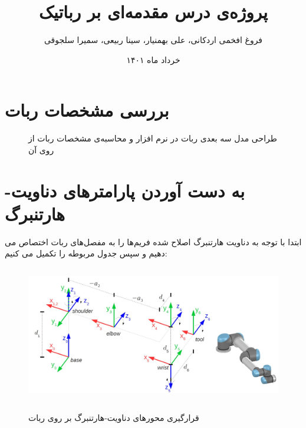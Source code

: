 \documentclass{article}
\begin{document}
\title{پروژه‌ی درس مقدمه‌ای بر رباتیک}

\date{خرداد ماه ۱۴۰۱}
\author{فروغ افخمی اردکانی، علی بهمنیار، سینا ربیعی، سمیرا سلجوقی}
\maketitle
\noindent
\section{بررسی مشخصات ربات}
\begin{figure}[H]%
    \centering
    \qquad
    \caption{طراحی مدل سه بعدی ربات در نرم افزار  و محاسبه‌ی مشخصات ربات از روی آن \label{fig:fig1}}
\end{figure}


\section{به دست آوردن پارامتر‌های دناویت-هارتنبرگ}
ابتدا با توجه به دناویت هارتنبرگ اصلاح شده  فریم‌ها را به مفصل‌های ربات اختصاص می دهیم و سپس جدول مربوطه را تکمیل می کنیم:
\begin{figure}[H]%
\includegraphics[height=6cm]{p3}
\label{fig:fig2}
\caption{قرارگیری محورهای دناویت-هارتنبرگ بر روی ربات}
\end{figure}
\end{document}
